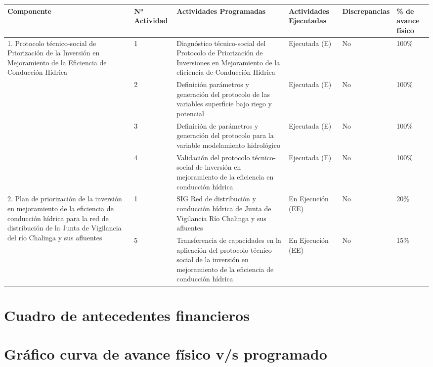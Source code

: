 \documentclass[]{article}
\begin{document}
\begin{table}[!htb]
\centering
\begin{tabular}{|p{3cm}|p{2cm}|p{3cm}|p{2.5cm}|p{2.5cm}|p{2cm}|}
    \hline
    \textbf{Componente} & \textbf{N° Actividad} & \textbf{Actividades Programadas} & \textbf{Actividades Ejecutadas} & \textbf{Discrepancias} & \textbf{\% de avance físico}\\
    \hline
    \multirow {4}{3cm}{1. Protocolo técnico-social de Priorización de la Inversión en Mejoramiento de la Eficiencia de Conducción Hídrica} & 1 & 		Diagnóstico técnico-social del Protocolo de Priorización de Inversiones en Mejoramiento de la eficiencia de Conducción Hídrica &  Ejecutada (E)  & No & 100\%\\
    \cline{2-6}
    & 2 & Definición parámetros y generación del protocolo de las variables superficie bajo riego y potencial & Ejecutada (E) & No & 100\%\\
    \cline{2-6}
    & 3 & Definición de parámetros y generación del protocolo para la variable modelamiento hidrológico & Ejecutada (E)  & No & 100\%\\
    \cline{2-6}
    & 4 & Validación del protocolo técnico-social de inversión en mejoramiento de la eficiencia en conducción hídrica & Ejecutada (E)  & No & 100\%\\
    \hline
    \multirow {4}{3cm}{2. Plan de priorización de la inversión en mejoramiento de la eficiencia de conducción hídrica para la red de distribución de la Junta de Vigilancia del río Chalinga y sus afluentes} & 		1 & 		SIG Red de distribución y conducción hídrica de Junta de Vigilancia Río Chalinga y sus afluentes & En Ejecución (EE)      		& No & 20\%\\
    \cline{2-6}
    & 5 & Transferencia de capacidades en la aplicación del protocolo técnico-social de la inversión en mejoramiento de la eficiencia de conducción hídrica & En Ejecución (EE)      		& No & 15\%\\
    \hline
   
\end{tabular}
\end{table}

\clearpage
\section{Cuadro de antecedentes financieros}

\clearpage
\section{Gráfico curva de avance físico v/s programado}
\end{document}
